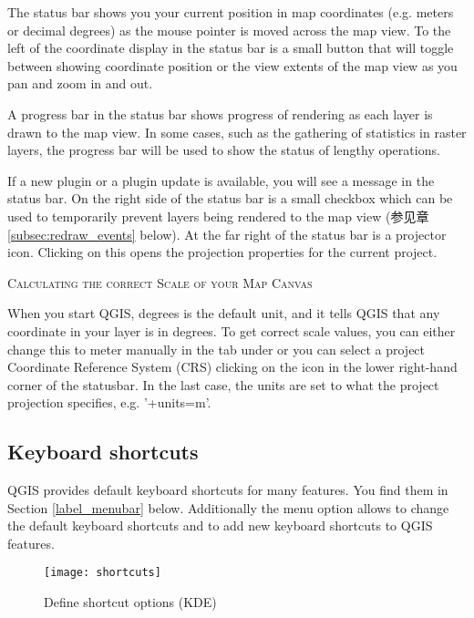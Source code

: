 The status bar shows you your current position in map coordinates (e.g.
meters or decimal degrees) as the mouse pointer is moved across the map view.
To the left of the coordinate display in the status bar is a small button that
will toggle between showing coordinate position or the view extents of the
map view as you pan and zoom in and out.

A progress bar in the status bar shows progress of rendering
as each layer is drawn to the map view. In some cases, such as the gathering
of statistics in raster layers, the progress bar will be used to show the
status of lengthy operations.

If a new plugin or a plugin update is available, you will see a message in the
status bar. On the right side of the status bar is a small
checkbox which can be used to temporarily prevent layers being rendered to the
map view (参见章 \ref{subsec:redraw_events} below). At the far right of
the status bar is a projector icon. Clicking on this opens the projection
properties for the current project.

\begin{Tip}\caption{\textsc{Calculating the correct Scale of your Map Canvas}}
When you start QGIS, degrees is the default unit, and it tells QGIS
that any coordinate in your layer is in degrees. To get correct scale values,
you can either change this to meter manually in the  tab under
 \arrow {} or you can select a project
Coordinate Reference System (CRS) clicking on the
icon in the lower right-hand corner of the statusbar. In the last case, the
units are set to what the project projection specifies, e.g. '+units=m'.
\end{Tip}

\subsection{Keyboard shortcuts}\label{shortcuts}

QGIS provides default keyboard shortcuts for many features. You find them in
Section \ref{label_menubar} below. Additionally the menu option  \arrow
{} allows to change the default keyboard
shortcuts and to add new keyboard shortcuts to QGIS features.

\begin{figure}[ht]
   \centering
   \texttt{[image: shortcuts]}
   \caption{Define shortcut options \nixcaption (KDE)} \label{fig:shortcuts}
\end{figure}

